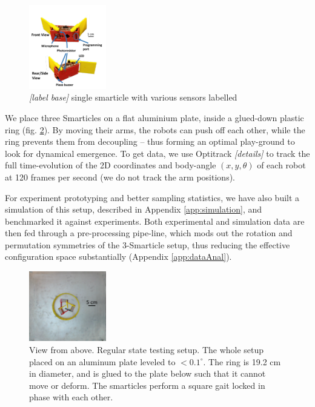 \documentclass[11pt]{article}
\renewcommand{\=}[1]{\stackrel{#1}{=}} %
\renewcommand{\deg}{^{\circ}} %
\renewcommand{\(}{\left (}
\renewcommand{\)}{\right  )}
\renewcommand{\[}{\left [}
\renewcommand{\]}{\right ]}
\newcommand{\<}{\left <}
\renewcommand{\>}{\right >}
\theoremstyle{definition}
\theoremstyle{remark}
\renewcommand{\todo}[1]{\textit{\color{red}[#1]}}
\begin{document}
\begin{figure} 
	\includegraphics[width=0.3\textwidth]{Smarticle.pdf}
	\caption{\todo{label base} single smarticle with various sensors labelled}
	\label{fig:smarticle}
\end{figure}

We place three Smarticles on a flat aluminium plate, inside a glued-down plastic ring (fig. \ref{fig:super3}). By moving their arms, the robots can push off each other, while the ring prevents them from decoupling -- thus forming an optimal play-ground to look for dynamical emergence. To get data, we use Optitrack \todo{details} to track the full time-evolution of the 2D coordinates and body-angle $ (x,y,\theta) $ of each robot at 120 frames per second (we do not track the arm positions). 

For experiment prototyping and better sampling statistics, we have also built a simulation of this setup, described in Appendix \ref{app:simulation}, and benchmarked it against experiments. Both experimental and simulation data are then fed through a pre-processing pipe-line, which mods out the rotation and permutation symmetries of the 3-Smarticle setup, thus reducing the effective configuration space substantially (Appendix \ref{app:dataAnal}).

\begin{figure}
	\includegraphics[width=0.3\textwidth]{3smRg.pdf}
	\caption{View from above. Regular state testing setup. The whole setup placed on an aluminum plate leveled to $ < 0.1\deg $. The ring is 19.2 cm in diameter, and is glued to the plate below such that it cannot move or deform. The smarticles perform a square gait locked in phase with each other.}
	\label{fig:super3}
\end{figure}
\end{document}
